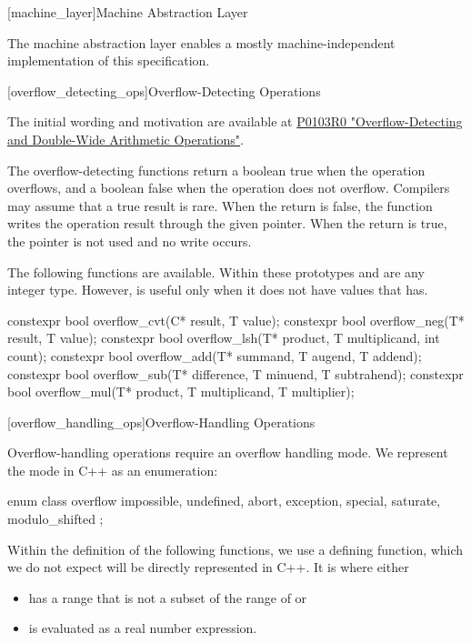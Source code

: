 \begin{addedblock}
[machine_layer]{Machine Abstraction Layer}

The machine abstraction layer enables a mostly machine-independent implementation of this specification.

[overflow_detecting_ops]{Overflow-Detecting Operations}
\begin{reviewnote}
The initial wording and motivation are available at \hyperlink{http://www.open-std.org/jtc1/sc22/wg21/docs/papers/2015/p0103r0.html}{P0103R0 "Overflow-Detecting and Double-Wide Arithmetic Operations"}.
\end{reviewnote}

The overflow-detecting functions return a boolean true when the operation overflows, and a boolean false when the operation does not overflow. Compilers may assume that a true result is rare. When the return is false, the function writes the operation result through the given pointer. When the return is true, the pointer is not used and no write occurs.

The following functions are available. Within these prototypes  and  are any integer type. However,  is useful only when it does not have values that  has.

\begin{codeblock}
constexpr bool overflow_cvt(C* result, T value);
constexpr bool overflow_neg(T* result, T value);
constexpr bool overflow_lsh(T* product, T multiplicand, int count);
constexpr bool overflow_add(T* summand, T augend, T addend);
constexpr bool overflow_sub(T* difference, T minuend, T subtrahend);
constexpr bool overflow_mul(T* product, T multiplicand, T multiplier);
\end{codeblock}

[overflow_handling_ops]{Overflow-Handling Operations}

Overflow-handling operations require an overflow handling mode. We represent the mode in C++ as an enumeration:

\begin{codeblock}
enum class overflow {
  impossible, undefined, abort, exception,
  special,
  saturate, modulo_shifted
};
\end{codeblock}

Within the definition of the following functions, we use a defining function, which we do not expect will be directly represented in C++. It is  where  either
\begin{itemize}
\item has a range that is not a subset of the range of  or
\item is evaluated as a real number expression.
\end{itemize}


\end{addedblock}
